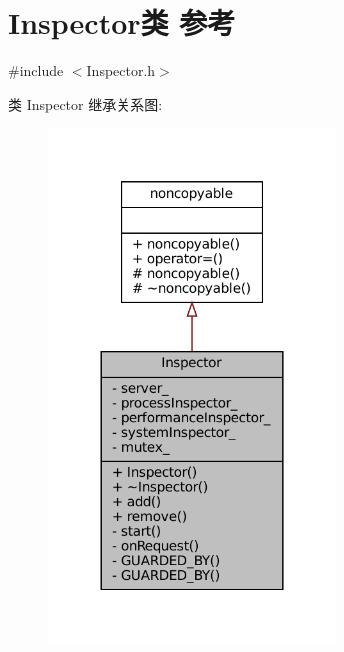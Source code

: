 \hypertarget{classmuduo_1_1net_1_1Inspector}{}\section{Inspector类 参考}
\label{classmuduo_1_1net_1_1Inspector}


{\ttfamily \#include $<$Inspector.\+h$>$}



类 Inspector 继承关系图\+:
\nopagebreak
\begin{figure}[H]
\begin{center}
\leavevmode
\includegraphics[width=216pt]{classmuduo_1_1net_1_1Inspector__inherit__graph}
\end{center}
\end{figure}


